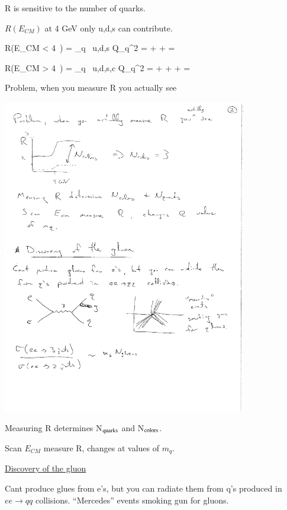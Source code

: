 {R is sensitive to the number of quarks.


$R(E_{CM})$ at 4 GeV only u,d,s can contribute.

\be
R(E_{CM} < 4\ ) = \sum_{q \in\ u,d,s} Q_q^2 =  +  +  = 
\ee


\be
R(E_{CM} > 4\ ) = \sum_{q \in\ u,d,s,c} Q_q^2 =  +  +  +  = 
\ee

\clearpage

Problem, when you measure R you actually see

\bc
\includegraphics[width=0.8\textwidth]{./ObservedR.pdf}
\ec

Measuring R determines N$_{\textrm{quarks}}$ and N$_{\textrm{colors}}$.

Scan $E_{CM}$ measure R, changes at values of $m_q$.


\underline{Discovery of the gluon}

Cant produce glues from e's, but you can radiate them from q's produced in $ee\rightarrow qq$ collisions.
``Mercedes'' events smoking gun for gluons.

}
